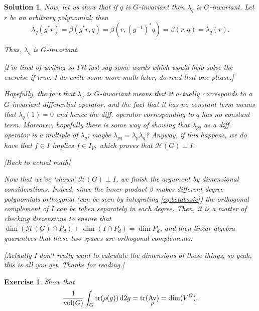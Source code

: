 \documentclass{article}
\newtheorem{ex}{Exercise}
\theoremstyle{nonumberplain}
\newtheorem{sol}{Solution}
\DeclareMathOperator{\vol}{vol}
\DeclareMathOperator{\Av}{Av}
\DeclareMathOperator{\trace}{tr}
\newcommand{\HH}{\mathcal{H}}
\begin{document}
\begin{sol}
Now, let us show that if $q$ is $G$-invariant then $\lambda_{q}$ is $G$-invariant. Let $r$ be an arbitrary polynomial; then
\begin{equation}
\lambda_q(g^* r) = \beta(g^* r, q) = \beta(r, (g^{-1})^* q) = \beta(r,q) = \lambda_q(r).
\end{equation}

Thus, $\lambda_q$ is $G$-invariant.

[I'm tired of writing so I'll just say some words which would help solve the exercise if true. I do write some more math later, do read that one please.]

Hopefully, the fact that $\lambda_q$ is $G$-invariant means that it actually corresponds to a $G$-invariant differential operator, and the fact that it has no constant term means that $\lambda_q(1) = 0$ and hence the diff. operator corresponding to $q$ has no constant term. Moreover, hopefully there is some way of showing that $\lambda_{pq}$ as a diff. operator is a multiple of $\lambda_q$; maybe $\lambda_{pq} = \lambda_p \lambda_q$? Anyway, if this happens, we do have that $f \in I$ implies $f \in I_V$, which proves that $\HH(G) \perp I$.

[Back to actual math]

Now that we've `shown' $\HH(G) \perp I$, we finish the argument by dimensional considerations. Indeed, since the inner product $\beta$ makes different degree polynomials orthogonal (can be seen by integrating \eqref{eq:betabasic}) the orthogonal complement of $I$ can be taken separately in each degree. Then, it is a matter of checking dimensions to ensure that $\dim(\HH(G) \cap P_d) + \dim(I \cap P_d) = \dim P_d$, and then linear algebra guarantees that these two spaces are orthogonal complements.

[Actually I don't really want to calculate the dimensions of these things, so yeah, this is all you get. Thanks for reading.]
\end{sol}

\begin{ex}
Show that
\begin{equation}
\frac1{\vol(G)} \int_G \trace(\rho(g)) \dl2 g = \trace(\Av_\rho) = \dim(V^G).
\end{equation}
\end{ex}
\end{document}
